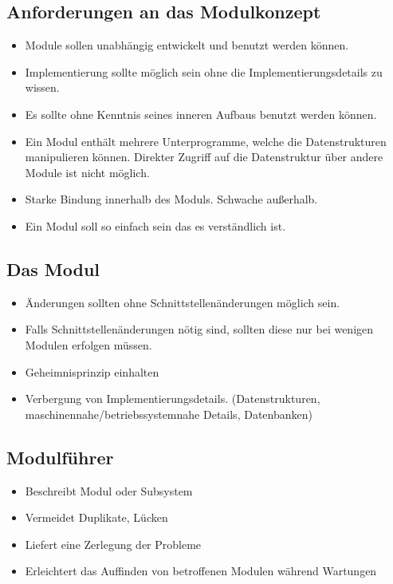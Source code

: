 \subsection{Anforderungen an das Modulkonzept}
\begin{itemize}
    \item Module sollen unabhängig entwickelt und benutzt werden können.
    \item Implementierung sollte möglich sein ohne die Implementierungsdetails zu wissen.
    \item Es sollte ohne Kenntnis seines inneren Aufbaus benutzt werden können.
    \item Ein Modul enthält mehrere Unterprogramme, welche die Datenstrukturen manipulieren können. Direkter Zugriff auf die Datenstruktur über andere Module ist nicht möglich.
    \item Starke Bindung innerhalb des Moduls. Schwache außerhalb.
    \item Ein Modul soll so einfach sein das es verständlich ist.
\end{itemize}

\subsection{Das Modul}
\begin{itemize}
    \item Änderungen sollten ohne Schnittstellenänderungen möglich sein.
    \item Falls Schnittstellenänderungen nötig sind, sollten diese nur bei wenigen Modulen erfolgen müssen.
    \item Geheimnisprinzip einhalten
    \item Verbergung von Implementierungsdetails. (Datenstrukturen, maschinennahe/betriebssystemnahe Details, Datenbanken)
\end{itemize}

\subsection{Modulführer}
\begin{itemize}
    \item Beschreibt Modul oder Subsystem
    \item Vermeidet Duplikate, Lücken
     \item Liefert eine Zerlegung der Probleme
     \item Erleichtert das Auffinden von betroffenen Modulen während Wartungen
\end{itemize}

